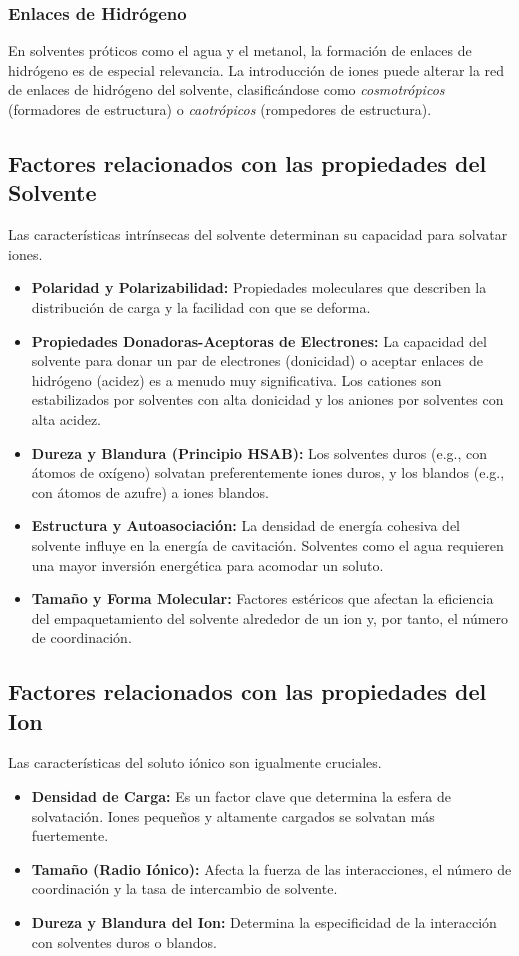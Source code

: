 \subsubsection{Enlaces de Hidrógeno}
En solventes próticos como el agua y el metanol, la formación de enlaces de hidrógeno es de especial relevancia. La introducción de iones puede alterar la red de enlaces de hidrógeno del solvente, clasificándose como \textit{cosmotrópicos} (formadores de estructura) o \textit{caotrópicos} (rompedores de estructura).

\subsection{Factores relacionados con las propiedades del Solvente}
Las características intrínsecas del solvente determinan su capacidad para solvatar iones.
\begin{itemize}
    \item \textbf{Polaridad y Polarizabilidad:} Propiedades moleculares que describen la distribución de carga y la facilidad con que se deforma.
    \item \textbf{Propiedades Donadoras-Aceptoras de Electrones:} La capacidad del solvente para donar un par de electrones (donicidad) o aceptar enlaces de hidrógeno (acidez) es a menudo muy significativa. Los cationes son estabilizados por solventes con alta donicidad y los aniones por solventes con alta acidez.
    \item \textbf{Dureza y Blandura (Principio HSAB):} Los solventes duros (e.g., con átomos de oxígeno) solvatan preferentemente iones duros, y los blandos (e.g., con átomos de azufre) a iones blandos.
    \item \textbf{Estructura y Autoasociación:} La densidad de energía cohesiva del solvente influye en la energía de cavitación. Solventes como el agua requieren una mayor inversión energética para acomodar un soluto.
    \item \textbf{Tamaño y Forma Molecular:} Factores estéricos que afectan la eficiencia del empaquetamiento del solvente alrededor de un ion y, por tanto, el número de coordinación.
\end{itemize}

\subsection{Factores relacionados con las propiedades del Ion}
Las características del soluto iónico son igualmente cruciales.
\begin{itemize}
    \item \textbf{Densidad de Carga:} Es un factor clave que determina la esfera de solvatación. Iones pequeños y altamente cargados se solvatan más fuertemente.
    \item \textbf{Tamaño (Radio Iónico):} Afecta la fuerza de las interacciones, el número de coordinación y la tasa de intercambio de solvente.
    \item \textbf{Dureza y Blandura del Ion:} Determina la especificidad de la interacción con solventes duros o blandos.
\end{itemize}


